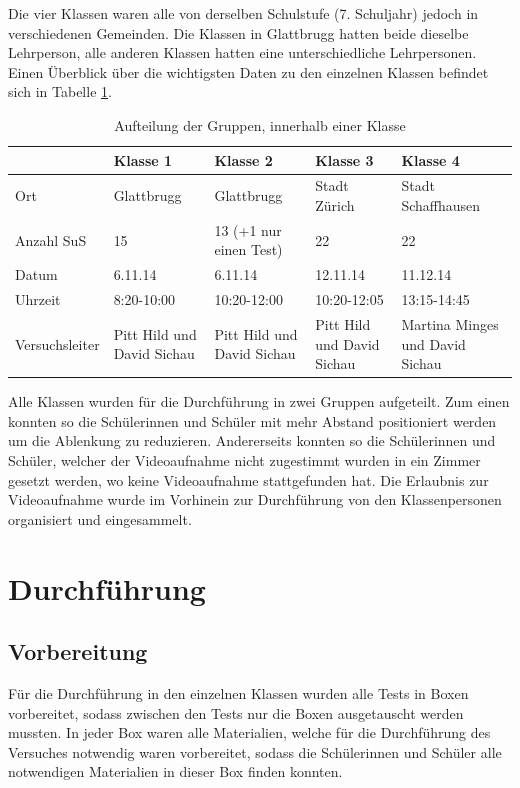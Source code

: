 Die vier Klassen waren alle von derselben Schulstufe (7. Schuljahr) jedoch in verschiedenen Gemeinden. Die Klassen in Glattbrugg hatten beide dieselbe Lehrperson, alle anderen Klassen hatten eine unterschiedliche Lehrpersonen. Einen Überblick über die wichtigsten Daten zu den einzelnen Klassen befindet sich in Tabelle \ref{tab:Klassen}. 


\begin{table}[htbp]
  \centering
  \begin{tabular}{p{2.3cm}p{3cm}p{3cm}p{3cm}p{3cm}}
  \toprule
   & Klasse 1 & Klasse 2 & Klasse 3 & Klasse 4 \\ 
  \midrule
   Ort & Glattbrugg & Glattbrugg & Stadt Zürich & Stadt Schaffhausen \\ [0.2cm]
   Anzahl SuS & 15 & 13 (+1 nur einen Test) & 22 & 22 \\ [0.2cm]
   Datum  & 6.11.14 & 6.11.14 & 12.11.14 & 11.12.14\\ [0.3cm]
   Uhrzeit & 8:20-10:00 & 10:20-12:00& 10:20-12:05 & 13:15-14:45 \\ [0.3cm]
   Versuchsleiter & Pitt Hild und David Sichau   & Pitt Hild und David Sichau  & Pitt Hild und David Sichau  & Martina Minges und David Sichau \\
  \bottomrule
  \end{tabular} 
  \caption{Aufteilung der Gruppen, innerhalb einer Klasse}
  \label{tab:Klassen}
\end{table}

Alle Klassen wurden für die Durchführung in zwei Gruppen aufgeteilt. Zum einen konnten so die Schülerinnen und Schüler mit mehr Abstand positioniert werden um die Ablenkung zu reduzieren. Andererseits konnten so die Schülerinnen und Schüler, welcher der Videoaufnahme nicht zugestimmt wurden in ein Zimmer gesetzt werden, wo keine Videoaufnahme stattgefunden hat. Die Erlaubnis zur Videoaufnahme wurde im Vorhinein zur Durchführung von den Klassenpersonen organisiert und eingesammelt.



\section{Durchführung}

\subsection{Vorbereitung}
Für die Durchführung in den einzelnen Klassen wurden alle Tests in Boxen vorbereitet, sodass zwischen den Tests nur die Boxen ausgetauscht werden mussten. In jeder Box waren alle Materialien, welche für die Durchführung des Versuches notwendig waren vorbereitet, sodass die Schülerinnen und Schüler alle notwendigen Materialien in dieser Box finden konnten.  

